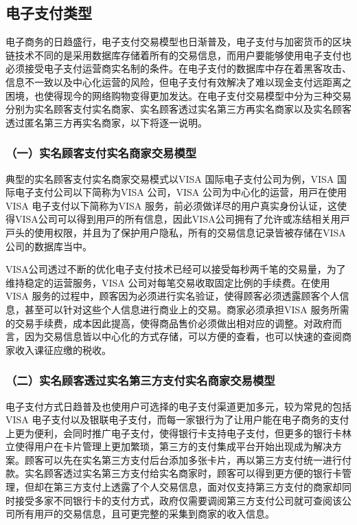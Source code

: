 	\subsection{电子支付类型}
	电子商务的日趋盛⾏，电⼦支付交易模型也日渐普及，电子支付与加密货币的区块链技术不同的是采用数据库存储着所有的交易信息，而用户要能够使用电子支付也必须接受电子支付运营商实名制的条件。在电子支付的数据库中存在着黑客攻击、信息不一致以及中心化运营的风险，但电⼦⽀付有效解决了难以现金支付远距离之困境，也使得现今的网络购物变得更加发达。在电子支付交易模型中分为三种交易分别为实名顾客支付实名商家、实名顾客透过实名第三方再实名商家以及实名顾客透过匿名第三方再实名商家，以下将逐一说明。

		\subsubsection{（一）实名顾客支付实名商家交易模型}
		典型的实名顾客支付实名商家交易模式以VISA 国际电⼦⽀付公司为例，VISA 国际电⼦⽀付公司以下简称为VISA 公司，VISA 公司为中⼼化的运营，⽤⼾在使用VISA 电⼦⽀付以下简称为VISA 服务，前必须做详尽的用户真实⾝份认证，这使得VISA公司可以得到⽤⼾的所有信息，因此VISA公司拥有了允许或冻结相关⽤⼾⼾头的使用权限，并且为了保护用户隐私，所有的交易信息记录皆被存储在VISA 公司的数据库当中。

		VISA公司透过不断的优化电⼦⽀付技术已经可以接受每秒两千笔的交易量，为了维持稳定的运营服务，VISA 公司对每笔交易收取固定⽐例的⼿续费。在使用VISA 服务的过程中，顾客因为必须进⾏实名验证，使得顾客必须透露顾客个⼈信息，甚⾄可以针对这些个⼈信息进⾏商业上的交易。商家必须承担VISA 服务所需的交易⼿续费，成本因此提高，使得商品售价必须做出相对应的调整。对政府⽽⾔，因为交易信息皆以中⼼化的⽅式存储，可以⽅便的查看，也可以快速的查阅商家收⼊课征应缴的税收。
		

		\subsubsection{（二）实名顾客透过实名第三方支付实名商家交易模型}
		电⼦⽀付⽅式⽇趋普及也使用户可选择的电⼦⽀付渠道更加多元，较为常⾒的包括VISA 电⼦⽀付以及银联电⼦⽀付，⽽每⼀家银⾏为了让用户能在电⼦商务的⽀付上更为便利，会同时推广电⼦⽀付，使得银⾏卡⽀持电⼦⽀付，但更多的银⾏卡林⽴使得用户在卡⽚管理上更加繁琐，第三⽅的支付集成平台开始出现成为解决⽅案。顾客可以先在实名第三⽅⽀付后台添加多张卡⽚，再以第三⽅⽀付统一进⾏付款。实名顾客透过实名第三⽅⽀付给实名商家时，顾客可以得到更⽅便的银⾏卡管理，但却在第三⽅⽀付上透露了个⼈交易信息，面对仅⽀持第三⽅⽀付的商家却同时接受多家不同银⾏卡的⽀付⽅式，政府仅需要调阅第三⽅⽀付公司就可查阅该公司所有⽤⼾的交易信息，且可更完整的采集到商家的收⼊信息。
		
